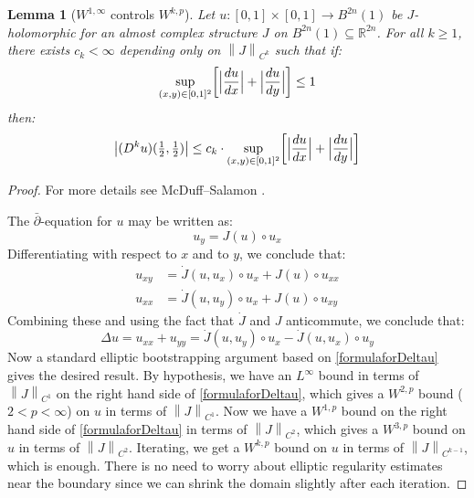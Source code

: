 \documentclass[12pt]{article}
\newtheorem{lemma}[theorem]{Lemma}
\theoremstyle{definition}
\theoremstyle{remark}
\numberwithin{equation}{subsection}
\newcommand{\RR}{\mathbb R}
\newcommand{\delbar}{\bar\partial}
\begin{document}
\begin{lemma}[$W^{1,\infty}$ controls $W^{k,p}$]\label{Woneinftycontrolsall}
Let $u:[0,1]\times[0,1]\to B^{2n}(1)$ be $J$-holomorphic for an almost complex structure $J$ on $B^{2n}(1)\subseteq\RR^{2n}$.  For all $k\geq 1$, there exists $c_k<\infty$ depending only on $\left\|J\right\|_{C^k}$ such that if:
\begin{equation}
\sup_{(x,y)\in[0,1]^2}\biggl[\Bigl|\frac{du}{dx}\Bigr|+\Bigl|\frac{du}{dy}\Bigr|\biggr]\leq 1
\end{equation}
then:
\begin{equation}
\left|(D^ku)({\textstyle\frac 12},{\textstyle\frac 12})\right|\leq c_k\cdot\sup_{(x,y)\in[0,1]^2}\biggl[\Bigl|\frac{du}{dx}\Bigr|+\Bigl|\frac{du}{dy}\Bigr|\biggr]
\end{equation}
\end{lemma}

\begin{proof}
For more details see McDuff--Salamon \cite[p533, \S B.4]{mcduffsalamonJholsymp}.

The $\delbar$-equation for $u$ may be written as:
\begin{equation}
u_y=J(u)\circ u_x
\end{equation}
Differentiating with respect to $x$ and to $y$, we conclude that:
\begin{align}
u_{xy}&=\dot J(u,u_x)\circ u_x+J(u)\circ u_{xx}\\
u_{xx}&=\dot J(u,u_y)\circ u_x+J(u)\circ u_{xy}
\end{align}
Combining these and using the fact that $\dot J$ and $J$ anticommute, we conclude that:
\begin{equation}\label{formulaforDeltau}
\Delta u=u_{xx}+u_{yy}=\dot J(u,u_y)\circ u_x-\dot J(u,u_x)\circ u_y
\end{equation}
Now a standard elliptic bootstrapping argument based on \eqref{formulaforDeltau} gives the desired result.  By hypothesis, we have an $L^\infty$ bound in terms of $\left\|J\right\|_{C^1}$ on the right hand side of \eqref{formulaforDeltau}, which gives a $W^{2,p}$ bound ($2<p<\infty$) on $u$ in terms of $\left\|J\right\|_{C^1}$.  Now we have a $W^{1,p}$ bound on the right hand side of \eqref{formulaforDeltau} in terms of $\left\|J\right\|_{C^2}$, which gives a $W^{3,p}$ bound on $u$ in terms of $\left\|J\right\|_{C^2}$.  Iterating, we get a $W^{k,p}$ bound on $u$ in terms of $\left\|J\right\|_{C^{k-1}}$, which is enough.  There is no need to worry about elliptic regularity estimates near the boundary since we can shrink the domain slightly after each iteration.
\end{proof}
\end{document}
